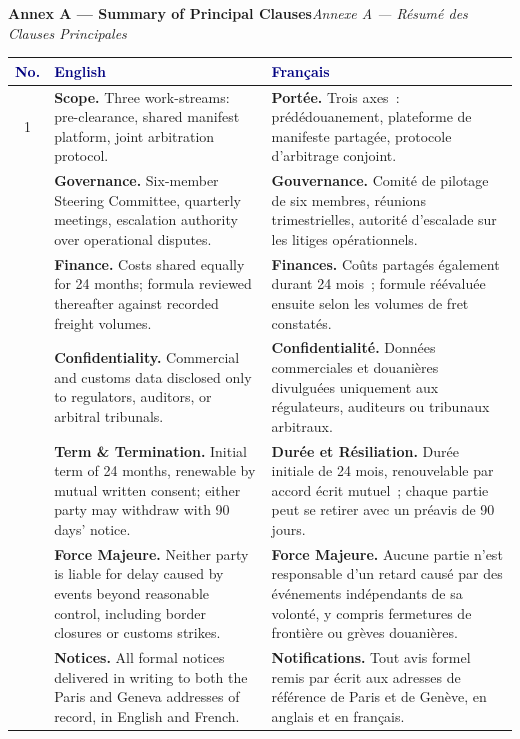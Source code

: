 \documentclass[paper=a4,fontsize=11pt,parskip=half,DIV=11,headsepline,footsepline,addrfield=true,backaddress=false,locfield=narrow,foldmarks=off,enlargefirstpage=on]{scrlttr2}
\begin{document}
\bigskip\bigskip

{\color{navy}\bfseries\Large Annex A --- Summary of Principal Clauses}\hfill{\color{gold}\itshape Annexe A --- R\'esum\'e des Clauses Principales}\par
\noindent{\color{gold}\rule{\dimexpr\linewidth-11pt\relax}{0.8pt}}\par\bigskip

\noindent\small
\begin{tabularx}{0.97\textwidth}{@{} c X X @{}}
\toprule
\rowcolor{pale}
\textcolor{navy}{\textbf{No.}} & \textcolor{navy}{\textbf{English}} & \textcolor{navy}{\textbf{Fran\c{c}ais}} \\
\midrule
1 & \textbf{Scope.} Three work-streams: pre-clearance, shared manifest platform, joint arbitration protocol. &
\textbf{Port\'ee.} Trois axes~: pr\'ed\'edouanement, plateforme de manifeste partag\'ee, protocole d'arbitrage conjoint. \\
\addlinespace
2 & \textbf{Governance.} Six-member Steering Committee, quarterly meetings, escalation authority over operational disputes. &
\textbf{Gouvernance.} Comit\'e de pilotage de six membres, r\'eunions trimestrielles, autorit\'e d'escalade sur les litiges op\'erationnels. \\
\addlinespace
3 & \textbf{Finance.} Costs shared equally for 24 months; formula reviewed thereafter against recorded freight volumes. &
\textbf{Finances.} Co\^uts partag\'es \'egalement durant 24 mois~; formule r\'e\'evalu\'ee ensuite selon les volumes de fret constat\'es. \\
\addlinespace
4 & \textbf{Confidentiality.} Commercial and customs data disclosed only to regulators, auditors, or arbitral tribunals. &
\textbf{Confidentialit\'e.} Donn\'ees commerciales et douani\`eres divulgu\'ees uniquement aux r\'egulateurs, auditeurs ou tribunaux arbitraux. \\
\addlinespace
5 & \textbf{Term \& Termination.} Initial term of 24 months, renewable by mutual written consent; either party may withdraw with 90 days' notice. &
\textbf{Dur\'ee et R\'esiliation.} Dur\'ee initiale de 24 mois, renouvelable par accord \'ecrit mutuel~; chaque partie peut se retirer avec un pr\'eavis de 90 jours. \\
\addlinespace
6 & \textbf{Force Majeure.} Neither party is liable for delay caused by events beyond reasonable control, including border closures or customs strikes. &
\textbf{Force Majeure.} Aucune partie n'est responsable d'un retard caus\'e par des \'ev\'enements ind\'ependants de sa volont\'e, y compris fermetures de fronti\`ere ou gr\`eves douani\`eres. \\
\addlinespace
7 & \textbf{Notices.} All formal notices delivered in writing to both the Paris and Geneva addresses of record, in English and French. &
\textbf{Notifications.} Tout avis formel remis par \'ecrit aux adresses de r\'ef\'erence de Paris et de Gen\`eve, en anglais et en fran\c{c}ais. \\
\bottomrule
\end{tabularx}
\end{document}
